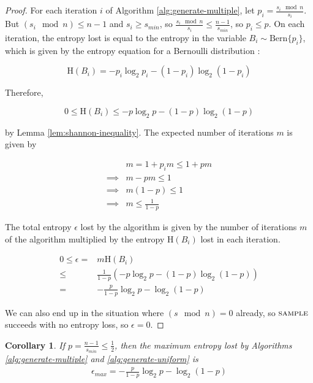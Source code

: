 \documentclass[12pt]{article}
\newtheorem{corollary}{Corollary}
\newcommand{\bern}[1]{\mathrm{Bern}\{#1\}}
\newcommand{\entropy}[1]{\mathrm{H}(#1)}
\begin{document}
\begin{proof}
For each iteration $i$ of Algorithm \ref{alg:generate-multiple}, let $p_i = \frac{s_i \mod n}{s_i}$. But $(s_i \mod n) \le n-1$ and $s_i \ge s_{min}$, so $\frac{s_i \mod n}{s_i} \le \frac{n-1}{s_{min}}$, so $p_i \le p$. On each iteration, the entropy lost is equal to the entropy in the variable $B_i \sim \bern{p_i}$, which is given by the entropy equation for a Bernoulli distribution \cite{cover1999elements}:

\begin{equation}
\entropy{B_i} = -p_i\log_2p_i - (1-p_i)\log_2(1-p_i)
\end{equation}

Therefore, 

\begin{equation}
0 \le \entropy{B_i} \le -p\log_2p - (1-p)\log_2(1-p) 
\end{equation}

by Lemma \ref{lem:shannon-inequality}. The expected number of iterations $m$ is given by

\begin{align}
& m = 1 + p_im \le 1 + pm \\
\implies & m-pm \le 1 \\
\implies & m(1-p) \le 1 \\
\implies & m \le \frac{1}{1-p}
\end{align}

The total entropy $\epsilon$ lost by the algorithm is given by the number of iterations $m$ of the algorithm multiplied by the entropy $\entropy{B_i}$ lost in each iteration.

\begin{align}
0 \le \epsilon
    = & m\entropy{B_i} \\
    \le & \frac{1}{1-p}(-p\log_2p - (1-p)\log_2(1-p) ) \\
    = & -\frac{p}{1-p}\log_2p - \log_2(1-p)
\end{align}

We can also end up in the situation where $(s \mod n) = 0$ already, so $\textsc{sample}$ succeeds with no entropy loss, so $\epsilon=0$.
\end{proof}

\begin{corollary}
    If $p = \frac{n-1}{s_{min}} \le \frac{1}{2}$, then the maximum entropy lost by Algorithms \ref{alg:generate-multiple} and \ref{alg:generate-uniform} is
\begin{align}
    \label{eq:epsilon-max}
    \epsilon_{max} = -\frac{p}{1-p}\log_2p - \log_2(1-p)
\end{align}
\end{corollary}
\end{document}
